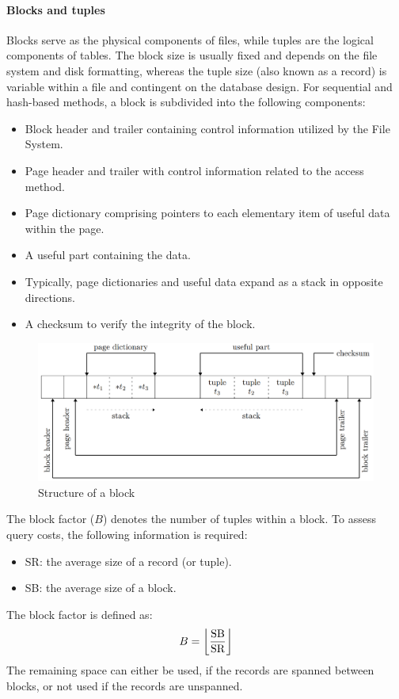 \paragraph*{Blocks and tuples}
Blocks serve as the physical components of files, while tuples are the logical components of tables.
The block size is usually fixed and depends on the file system and disk formatting, whereas the tuple size (also known as a record) is variable within a file and contingent on the database design.
For sequential and hash-based methods, a block is subdivided into the following components:
\begin{itemize}
    \item Block header and trailer containing control information utilized by the File System.
    \item Page header and trailer with control information related to the access method. 
    \item Page dictionary comprising pointers to each elementary item of useful data within the page.
    \item A useful part containing the data. 
    \item Typically, page dictionaries and useful data expand as a stack in opposite directions.
    \item A checksum to verify the integrity of the block.
\end{itemize}
\begin{figure}[H]
    \centering
    \includegraphics[width=0.75\linewidth]{images/block.png}
    \caption{Structure of a block}
\end{figure} 
The block factor ($B$) denotes the number of tuples within a block. 
To assess query costs, the following information is required:
\begin{itemize}
    \item SR: the average size of a record (or tuple). 
    \item SB: the average size of a block. 
\end{itemize}
The block factor is defined as:
\[B=\left\lfloor \dfrac{\textnormal{SB}}{\textnormal{SR}} \right\rfloor \]
The remaining space can either be used, if the records are spanned between blocks, or not used if the records are unspanned.

